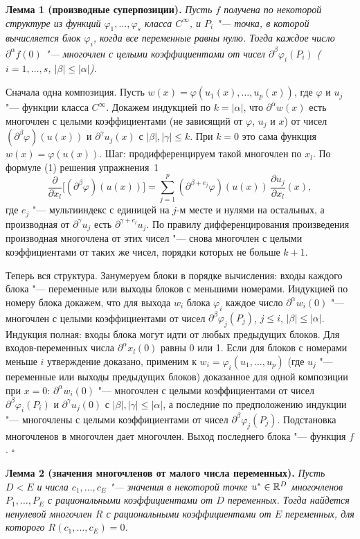 \begin{solution}[6 (\S\,5)]
\textbf{Лемма 1 (производные суперпозиции).} \emph{Пусть $f$ получена по
некоторой структуре из функций $\varphi_1,\dots,\varphi_s$ класса $C^\infty$,
и $P_i$ "--- точка, в которой вычисляется блок $\varphi_i$, когда все
переменные равны нулю. Тогда каждое число $\partial^\alpha f(0)$ "--- многочлен
с целыми коэффициентами от чисел $\partial^\beta\varphi_i(P_i)$ ($i=1,\dots,s$,
$|\beta|\le|\alpha|$).}

Сначала одна композиция. Пусть $w(x)=\varphi(u_1(x),\dots,u_p(x))$, где
$\varphi$ и $u_j$ "--- функции класса $C^\infty$. Докажем индукцией по $k=|\alpha|$,
что $\partial^\alpha w(x)$ есть многочлен с целыми коэффициентами (не
зависящий от $\varphi$, $u_j$ и $x$) от чисел $(\partial^\beta\varphi)(u(x))$
и $\partial^\gamma u_j(x)$ с $|\beta|,|\gamma|\le k$. При $k=0$ это сама
функция $w(x)=\varphi(u(x))$. Шаг: продифференцируем такой многочлен по $x_l$.
По формуле (1) решения упражнения~1
\[
\frac{\partial}{\partial x_l}\bigl[(\partial^\beta\varphi)(u(x))\bigr]
=\sum_{j=1}^p(\partial^{\beta+e_j}\varphi)(u(x))\,\frac{\partial u_j}{\partial x_l}(x),
\]
где $e_j$ "--- мультииндекс с единицей на $j$-м месте и нулями на остальных,
а производная от $\partial^\gamma u_j$ есть $\partial^{\gamma+e_l}u_j$. По
правилу дифференцирования произведения производная многочлена от этих чисел
"--- снова многочлен с целыми коэффициентами от таких же чисел, порядки
которых не больше $k+1$.

Теперь вся структура. Занумеруем блоки в порядке вычисления: входы каждого
блока "--- переменные или выходы блоков с меньшими номерами. Индукцией по
номеру блока докажем, что для выхода $w_i$ блока $\varphi_i$ каждое число
$\partial^\alpha w_i(0)$ "--- многочлен с целыми коэффициентами от чисел
$\partial^\beta\varphi_j(P_j)$, $j\le i$, $|\beta|\le|\alpha|$. Индукция полная:
входы блока могут идти от любых предыдущих блоков. Для входов-переменных
числа $\partial^\alpha x_l(0)$ равны 0 или 1. Если для блоков с номерами меньше
$i$ утверждение доказано, применим к $w_i=\varphi_i(u_1,\dots,u_p)$ (где $u_j$
"--- переменные или выходы предыдущих блоков) доказанное для одной
композиции при $x=0$: $\partial^\alpha w_i(0)$ "--- многочлен с целыми
коэффициентами от чисел $\partial^\beta\varphi_i(P_i)$ и $\partial^\gamma u_j(0)$
с $|\beta|,|\gamma|\le|\alpha|$, а последние по предположению индукции "---
многочлены с целыми коэффициентами от чисел $\partial^\beta\varphi_j(P_j)$.
Подстановка многочленов в многочлен дает многочлен. Выход последнего блока
"--- функция $f$. $\square$

\textbf{Лемма 2 (значения многочленов от малого числа переменных).} \emph{Пусть
$D<E$ и числа $c_1,\dots,c_E$ "--- значения в некоторой точке $u^*\in\mathbb R^D$
многочленов $P_1,\dots,P_E$ с рациональными коэффициентами от $D$ переменных.
Тогда найдется ненулевой многочлен $R$ с рациональными коэффициентами от $E$
переменных, для которого $R(c_1,\dots,c_E)=0$.}


\end{solution}

